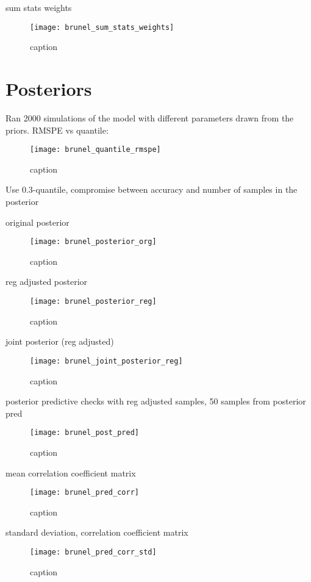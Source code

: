 sum stats weights

\begin{figure}[H]
    \centering
    \texttt{[image: brunel\_sum\_stats\_weights]}
    \caption{caption}
    \label{fig:fig1}
\end{figure}

\section{Posteriors} 

Ran 2000 simulations of the model with different parameters drawn from the priors. RMSPE vs quantile: 

\begin{figure}[H]
    \centering
    \texttt{[image: brunel\_quantile\_rmspe]}
    \caption{caption}
    \label{fig:fig1}
\end{figure}

Use 0.3-quantile, compromise between accuracy and number of samples in the posterior

original posterior

\begin{figure}[H]
    \centering
    \texttt{[image: brunel\_posterior\_org]}
    \caption{caption}
    \label{fig:fig1}
\end{figure}

reg adjusted posterior

\begin{figure}[H]
    \centering
    \texttt{[image: brunel\_posterior\_reg]}
    \caption{caption}
    \label{fig:fig1}
\end{figure}


joint posterior (reg adjusted)

\begin{figure}[H]
    \centering
    \texttt{[image: brunel\_joint\_posterior\_reg]}
    \caption{caption}
    \label{fig:fig1}
\end{figure}

posterior predictive checks with reg adjusted samples, 50 samples from posterior pred

\begin{figure}[H]
    \centering
    \texttt{[image: brunel\_post\_pred]}
    \caption{caption}
    \label{fig:fig1}
\end{figure}

mean correlation coefficient matrix 

\begin{figure}[H]
    \centering
    \texttt{[image: brunel\_pred\_corr]}
    \caption{caption}
    \label{fig:fig1}
\end{figure}

standard deviation, correlation coefficient matrix

\begin{figure}[H]
    \centering
    \texttt{[image: brunel\_pred\_corr\_std]}
    \caption{caption}
    \label{fig:fig1}
\end{figure}

